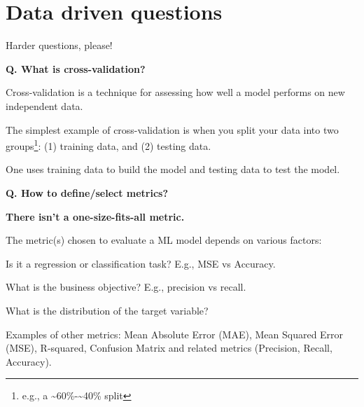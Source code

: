 \section{Data driven questions}
\begin{transitionframe}
  \begin{center}
    \Huge Harder questions, please!
  \end{center}
\end{transitionframe}



\begin{frame}[fragile]{\textbf{Q. What is cross-validation?}}
  \begin{wideitemize}
    \item Cross-validation is a technique for assessing how well a model
    performs on new independent data.
    \item The simplest example of cross-validation is when you split your
    data into two groups\footnote{e.g., a \~{}60\%-\~{}40\% split}:
    (1) training data, and (2) testing data.
    \item One uses training data to build the model and testing
    data to test the model.
  \end{wideitemize}
\end{frame}

\begin{frame}[fragile]{\textbf{Q. How to define/select metrics?}}
\begin{wideitemize}
  \item {\large \textbf{There isn't a one-size-fits-all metric.}}
  \item The metric(s) chosen to evaluate a ML model depends on various factors:
  \begin{wideitemize}
    \item Is it a regression or classification task? E.g., MSE vs Accuracy. 
    \item What is the business objective? E.g., precision vs recall.
    \item What is the distribution of the target variable?
  \end{wideitemize}
  \item Examples of other metrics: Mean Absolute Error (MAE), Mean Squared Error
    (MSE), R-squared, Confusion Matrix and related metrics (Precision, Recall, Accuracy).
\end{wideitemize}
\end{frame}



